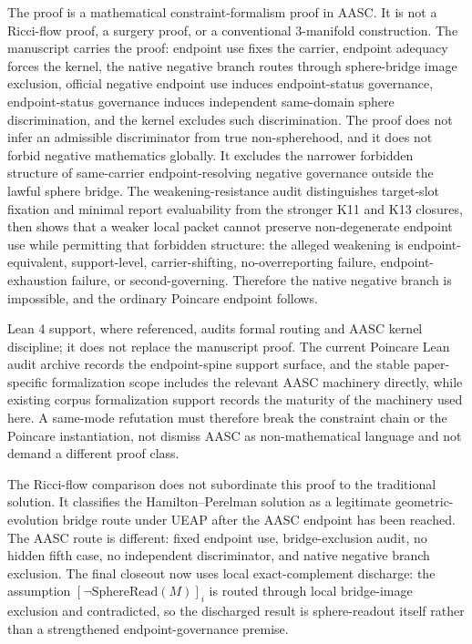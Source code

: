 \documentclass[11pt]{article}
\newcommand{\SphereRead}{\mathrm{SphereRead}}
\begin{document}
The proof is a mathematical constraint-formalism proof in AASC. It is not a Ricci-flow proof, a surgery proof, or a conventional 3-manifold construction. The manuscript carries the proof: endpoint use fixes the carrier, endpoint adequacy forces the kernel, the native negative branch routes through sphere-bridge image exclusion, official negative endpoint use induces endpoint-status governance, endpoint-status governance induces independent same-domain sphere discrimination, and the kernel excludes such discrimination. The proof does not infer an admissible discriminator from true non-spherehood, and it does not forbid negative mathematics globally. It excludes the narrower forbidden structure of same-carrier endpoint-resolving negative governance outside the lawful sphere bridge. The weakening-resistance audit distinguishes target-slot fixation and minimal report evaluability from the stronger K11 and K13 closures, then shows that a weaker local packet cannot preserve non-degenerate endpoint use while permitting that forbidden structure: the alleged weakening is endpoint-equivalent, support-level, carrier-shifting, no-overreporting failure, endpoint-exhaustion failure, or second-governing. Therefore the native negative branch is impossible, and the ordinary Poincare endpoint follows.

Lean 4 support, where referenced, audits formal routing and AASC kernel discipline; it does not replace the manuscript proof. The current Poincare Lean audit archive records the endpoint-spine support surface, and the stable paper-specific formalization scope includes the relevant AASC machinery directly, while existing corpus formalization support records the maturity of the machinery used here. A same-mode refutation must therefore break the constraint chain or the Poincare instantiation, not dismiss AASC as non-mathematical language and not demand a different proof class.

The Ricci-flow comparison does not subordinate this proof to the traditional solution. It classifies the Hamilton--Perelman solution as a legitimate geometric-evolution bridge route under UEAP after the AASC endpoint has been reached. The AASC route is different: fixed endpoint use, bridge-exclusion audit, no hidden fifth case, no independent discriminator, and native negative branch exclusion. The final closeout now uses local exact-complement discharge: the assumption \([\neg\SphereRead(M)]_i\) is routed through local bridge-image exclusion and contradicted, so the discharged result is sphere-readout itself rather than a strengthened endpoint-governance premise.
\end{document}
